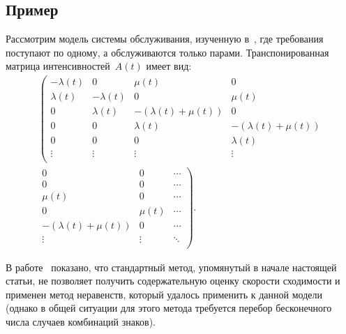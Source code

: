 \begin{multicols}{2}
    \section{Пример}
    
    Рассмотрим модель системы обслуживания, изученную в~\cite{Satin2019a}, 
где требования поступают по одному, а обслуживаются только парами. 
Транспонированная матрица интенсивностей~$ A(t) $ имеет вид:
            \begin{multline*}
            \left(
            \begin{array}{cccc}
                -\lambda(t) & 0  & \mu(t)  & 0  \\                             
                           \lambda(t) &-\lambda(t) & 0   & \mu(t) \\                          
                           0 &\lambda(t) & -\left(\lambda(t) + \mu(t) \right) & 0\\           
                        0 & 0 & \lambda(t) & -\left(\lambda(t) + \mu(t) \right) \\         
                        0 & 0 & 0 & \lambda(t) \\ 
            \vdots   & \vdots   &   \vdots   & \vdots\\                        
            \end{array}\right.
            \\
          \left.  
          \begin{array}{ccc}
                0  & 0  & \cdots \\                
                0  & 0  & \cdots \\                
                \mu(t)  & 0  & \cdots \\           
                0  & \mu(t)  & \cdots \\           
                      -\left(\lambda(t) + \mu(t) \right) & 0 &\cdots\\  
                  \vdots  & \vdots    & \ddots \\    
                        \end{array}
            \right).
        \end{multline*}

В работе~\cite{Satin2019a} показано, что стандартный метод, упомянутый в начале 
настоящей статьи, не позволяет получить содержательную оценку скорости 
сходимости и применен метод неравенств, который  удалось применить к данной 
модели (однако в общей ситуации для этого метода требуется перебор бесконечного 
числа случаев комбинаций знаков).


\end{multicols}
